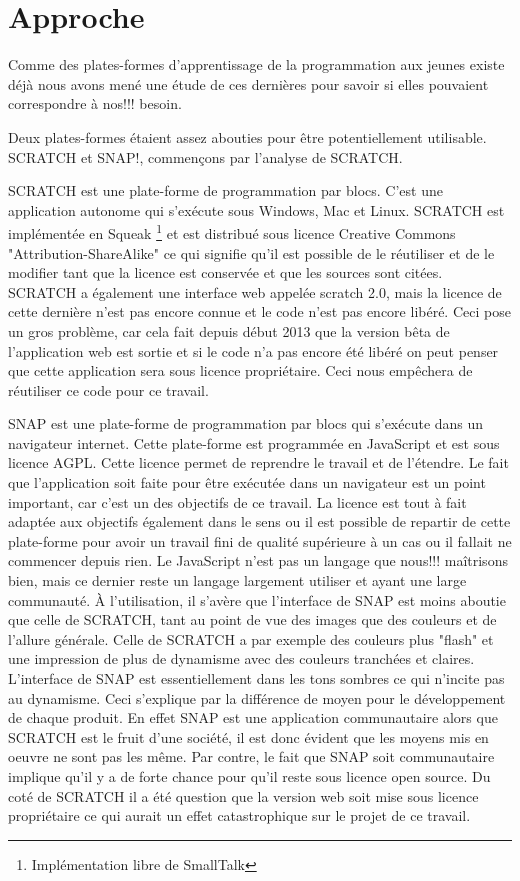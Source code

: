 \section{Approche}
\label{intro-approche}
Comme des plates-formes d'apprentissage de la programmation aux jeunes existe déjà nous avons mené une étude de ces dernières pour savoir si elles pouvaient correspondre à nos!!! besoin.

Deux plates-formes étaient assez abouties pour être potentiellement utilisable. SCRATCH et SNAP!, commençons par l'analyse de SCRATCH.

SCRATCH est une plate-forme de programmation par blocs. C'est une application autonome qui s'exécute sous Windows, Mac et Linux. SCRATCH est implémentée en Squeak \footnote{Implémentation libre de SmallTalk} et est distribué sous licence Creative Commons "Attribution-ShareAlike" ce qui signifie qu'il est possible de le réutiliser et de le modifier tant que la licence est conservée et que les sources sont citées. SCRATCH a également une interface web appelée scratch 2.0, mais la licence de cette dernière n'est pas encore connue et le code n'est pas encore libéré. Ceci pose un gros problème, car cela fait depuis début 2013 que la version bêta de l'application web est sortie et si le code n'a pas encore été libéré on peut penser que cette application sera sous licence propriétaire. Ceci nous empêchera de réutiliser ce code pour ce travail.

SNAP est une plate-forme de programmation par blocs qui s'exécute dans un navigateur internet. Cette plate-forme est programmée en JavaScript et est sous licence AGPL. Cette licence permet de reprendre le travail et de l'étendre. Le fait que l'application soit faite pour être exécutée dans un navigateur est un point important, car c'est un des objectifs de ce travail. La licence est tout à fait adaptée aux objectifs également dans le sens ou il est possible de repartir de cette plate-forme pour avoir un travail fini de qualité supérieure à un cas ou il fallait ne commencer depuis rien. Le JavaScript n'est pas un langage que nous!!! maîtrisons bien, mais ce dernier reste un langage largement utiliser et ayant une large communauté.
À l'utilisation, il s'avère que l'interface de SNAP est moins aboutie que celle de SCRATCH, tant au point de vue des images que des couleurs et de l'allure générale. Celle de SCRATCH a par exemple des couleurs plus "flash" et une impression de plus de dynamisme avec des couleurs tranchées et claires. L'interface de SNAP est essentiellement dans les tons sombres ce qui n'incite pas au dynamisme. Ceci s'explique par la différence de moyen pour le développement de chaque produit. En effet SNAP est une application communautaire alors que SCRATCH est le fruit d'une société, il est donc évident que les moyens mis en oeuvre ne sont pas les même. Par contre, le fait que SNAP soit communautaire implique qu'il y a de forte chance pour qu'il reste sous licence open source. Du coté de SCRATCH il a été question que la version web soit mise sous licence propriétaire ce qui aurait un effet catastrophique sur le projet de ce travail.


